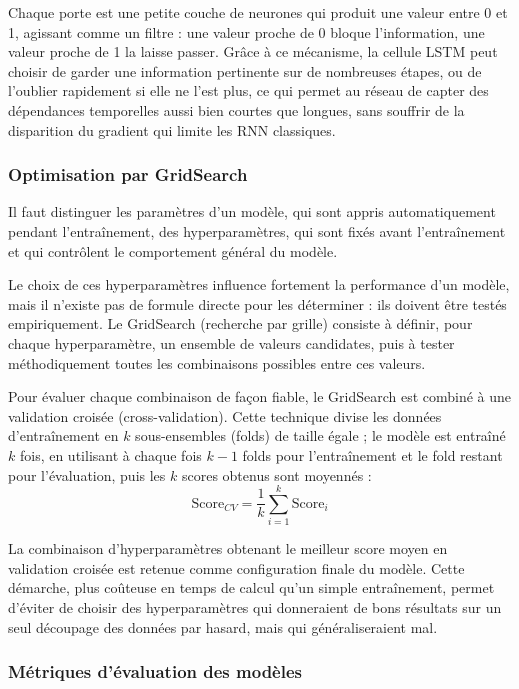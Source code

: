 \documentclass[a4paper,12pt, oneside]{article}
\begin{document}
Chaque porte est une petite couche de neurones qui produit une valeur entre 0 et 1, agissant comme un filtre : une valeur proche de 0 bloque l'information, une valeur proche de 1 la laisse passer. Grâce à ce mécanisme, la cellule LSTM peut choisir de garder une information pertinente sur de nombreuses étapes, ou de l'oublier rapidement si elle ne l'est plus, ce qui permet au réseau de capter des dépendances temporelles aussi bien courtes que longues, sans souffrir de la disparition du gradient qui limite les RNN classiques.

\subsubsection{Optimisation par GridSearch}

Il faut distinguer les paramètres d'un modèle, qui sont appris automatiquement pendant l'entraînement, des hyperparamètres, qui sont fixés avant l'entraînement et qui contrôlent le comportement général du modèle.

Le choix de ces hyperparamètres influence fortement la performance d'un modèle, mais il n'existe pas de formule directe pour les déterminer : ils doivent être testés empiriquement. Le GridSearch (recherche par grille) consiste à définir, pour chaque hyperparamètre, un ensemble de valeurs candidates, puis à tester méthodiquement toutes les combinaisons possibles entre ces valeurs.

Pour évaluer chaque combinaison de façon fiable, le GridSearch est combiné à une validation croisée (cross-validation). Cette technique divise les données d'entraînement en $k$ sous-ensembles (folds) de taille égale ; le modèle est entraîné $k$ fois, en utilisant à chaque fois $k-1$ folds pour l'entraînement et le fold restant pour l'évaluation, puis les $k$ scores obtenus sont moyennés :
\[
\text{Score}_{CV} = \frac{1}{k}\sum_{i=1}^{k} \text{Score}_i
\]

La combinaison d'hyperparamètres obtenant le meilleur score moyen en validation croisée est retenue comme configuration finale du modèle. Cette démarche, plus coûteuse en temps de calcul qu'un simple entraînement, permet d'éviter de choisir des hyperparamètres qui donneraient de bons résultats sur un seul découpage des données par hasard, mais qui généraliseraient mal.

\subsubsection{Métriques d'évaluation des modèles}
\end{document}
